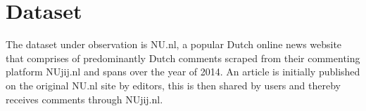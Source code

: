 \chapter{Dataset}

The dataset under observation is NU.nl, a popular Dutch online news website that comprises of predominantly Dutch comments scraped from their commenting platform NUjij.nl and spans over the year of 2014. An article is initially published on the original NU.nl site by editors, this is then shared by users and thereby receives comments through NUjij.nl.
